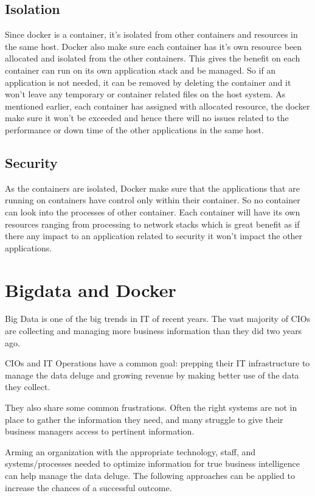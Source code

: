 \documentclass[sigconf]{acmart}
\begin{document}
	\subsection{Isolation}
	
	Since docker is a container, it's isolated from other containers and resources in the same host. Docker also make sure each container has it's own resource been allocated and isolated from the other containers. This gives the benefit on each container can run on its own application stack and be managed. So if an application is not needed, it can be removed by  deleting the container and it won't leave any temporary or container related files on the host system.
	As mentioned earlier, each container has assigned with allocated resource, the docker make  sure it won't be exceeded and hence there will no issues related to the performance or down time of the other applications in the same host.\cite{Isolation}
	\subsection{Security}
	
	As the containers are isolated, Docker make sure that the applications that are running on containers have control only within their container. So no container can look into the processes of other container. Each container will have its own resources ranging from processing to network stacks which is great benefit as if there any impact to an application related to security it won't impact the other applications.
	
	\cite{DockerSecurity}
	
	
	\section{Bigdata and Docker}
	
	Big Data is one of the big trends in IT of recent years. The vast majority of CIOs are collecting and managing more business information than they did two years ago.
	
	CIOs and IT Operations have a common goal: prepping their IT infrastructure to manage the data deluge and growing revenue by making better use of the data they collect.
	
	They also share some common frustrations. Often the right systems are not in place to gather the information they need, and many struggle to give their business managers access to pertinent information.
	
	Arming an organization with the appropriate technology, staff, and systems/processes needed to optimize information for true business intelligence can help manage the data deluge. The following approaches can be applied to increase the chances of a successful outcome.
\end{document}
